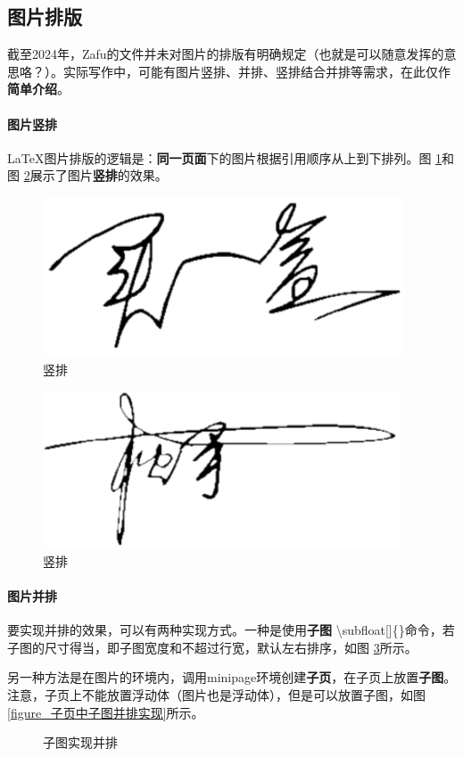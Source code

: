 \documentclass[AutoFakeBold]{ZafuThesis}
\begin{document}
\subsection{图片排版}
截至2024年，Zafu的文件并未对图片的排版有明确规定（也就是可以随意发挥的意思咯？）。实际写作中，可能有图片竖排、并排、竖排结合并排等需求，在此仅作\textbf{简单介绍}。
\paragraph{图片竖排}
\LaTeX 图片排版的逻辑是：\textbf{同一页面}下的图片根据引用顺序从上到下排列。图 \ref{figures_sp0}和图 \ref{figures_sp1}展示了图片\textbf{竖排}的效果。\par
\begin{figure}[htbp]
  \centering
  \includegraphics[width=0.24\columnwidth]{figures/MaiYihe}
  \caption{竖排}
  \label{figures_sp0}
\end{figure}
\begin{figure}[htbp]
  \centering
  \includegraphics[width=0.26\columnwidth]{figures/SongShou}
  \caption{竖排}
  \label{figures_sp1}
\end{figure}

\paragraph{图片并排}
要实现并排的效果，可以有两种实现方式。一种是使用\textbf{子图} \textbackslash subfloat[]\{\}命令，若子图的尺寸得当，即子图宽度和不超过行宽，默认左右排序，如图 \ref{figure_子图实现并排}所示。\par
另一种方法是在图片的环境内，调用minipage环境创建\textbf{子页}，在子页上放置\textbf{子图}。注意，子页上不能放置浮动体（图片也是浮动体），但是可以放置子图，如图 \ref{figure_子页中子图并排实现}所示。\par

\begin{figure}[htbp]
  \centering
  \hspace{1cm}
  \caption{子图实现并排}  
  \label{figure_子图实现并排}
\end{figure}
\end{document}
